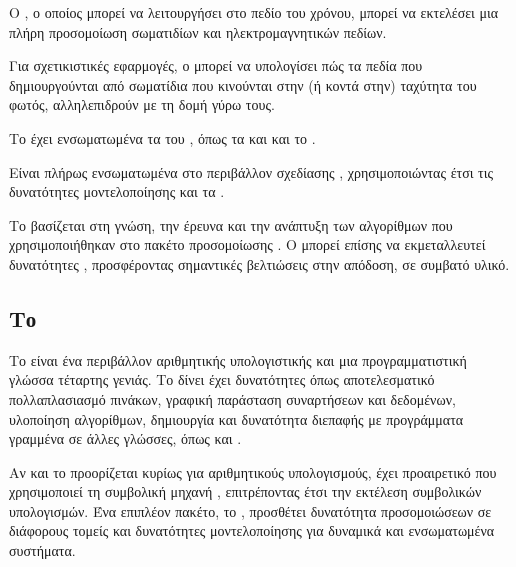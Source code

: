 Ο , ο οποίος μπορεί να λειτουργήσει στο πεδίο του χρόνου, μπορεί να εκτελέσει μια πλήρη προσομοίωση σωματιδίων και ηλεκτρομαγνητικών πεδίων.

Για σχετικιστικές εφαρμογές, ο  μπορεί να υπολογίσει πώς τα πεδία που δημιουργούνται από σωματίδια που κινούνται στην (ή κοντά στην) ταχύτητα του φωτός, αλληλεπιδρούν με τη δομή γύρω τους.

Το  έχει ενσωματωμένα τα  του , όπως τα  και  και το .

Είναι πλήρως ενσωματωμένα στο περιβάλλον σχεδίασης , χρησιμοποιώντας έτσι τις δυνατότητες μοντελοποίησης και τα .

Το  βασίζεται στη γνώση, την έρευνα και την ανάπτυξη των αλγορίθμων που χρησιμοποιήθηκαν στο πακέτο προσομοίωσης . 
Ο  μπορεί επίσης να εκμεταλλευτεί δυνατότητες , προσφέροντας σημαντικές βελτιώσεις στην απόδοση, σε συμβατό υλικό.

\subsection{Το }
Το  είναι ένα περιβάλλον αριθμητικής υπολογιστικής και μια προγραμματιστική γλώσσα τέταρτης γενιάς. 
Το  δίνει έχει δυνατότητες όπως αποτελεσματικό πολλαπλασιασμό πινάκων, γραφική παράσταση συναρτήσεων και δεδομένων, υλοποίηση αλγορίθμων, δημιουργία  και δυνατότητα διεπαφής με προγράμματα γραμμένα σε άλλες γλώσσες, όπως
 και .

Αν και το  προορίζεται κυρίως για αριθμητικούς υπολογισμούς, έχει προαιρετικό  που χρησιμοποιεί τη συμβολική μηχανή , επιτρέποντας έτσι την εκτέλεση συμβολικών υπολογισμών.
Ένα επιπλέον πακέτο, το , προσθέτει δυνατότητα προσομοιώσεων σε διάφορους τομείς και δυνατότητες μοντελοποίησης για δυναμικά και ενσωματωμένα συστήματα.

